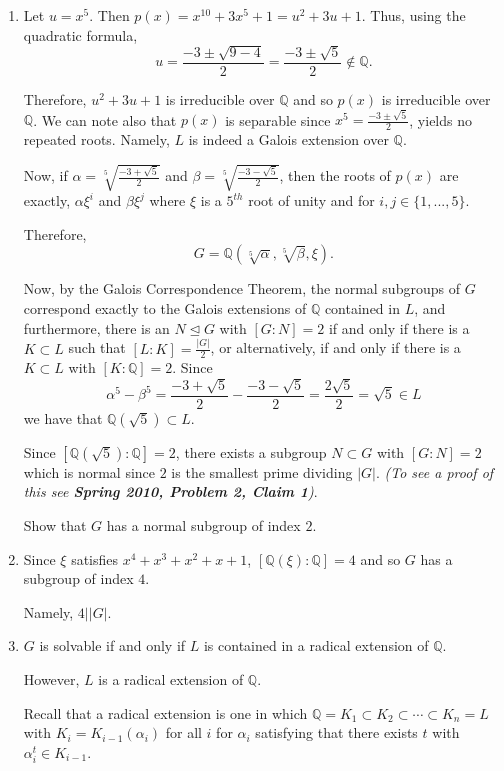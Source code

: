 \documentclass[12pt]{AlgebraQual}
\begin{document}
\begin{solution}$\,$
\begin{enumerate}[label=(\alph*)]
    \item Let $u=x^5$. Then $p(x)=x^{10}+3x^5+1=u^2+3u+1.$ Thus, using the quadratic formula, $$u=\frac{-3\pm\sqrt{9-4}}{2}=\frac{-3\pm\sqrt{5}}{2}\notin\mathbb{Q}.$$

    Therefore, $u^2+3u+1$ is irreducible over $\mathbb{Q}$ and so $p(x)$ is irreducible over $\mathbb{Q}$. We can note also that $p(x)$ is separable since $x^5=\frac{-3\pm\sqrt{5}}{2}$, yields no repeated roots. Namely, $L$ is indeed a Galois extension over $\mathbb{Q}$.

    Now, if $\alpha=\sqrt[5]{\frac{-3+\sqrt{5}}{2}}$ and $\beta=\sqrt[5]{\frac{-3-\sqrt{5}}{2}}$, then the roots of $p(x)$ are exactly, $\alpha\xi^i$ and $\beta\xi^j$ where $\xi$ is a $5^{th}$ root of unity and for $i,j\in\{1,...,5\}$.

    Therefore, $$G=\mathbb{Q}(\sqrt[5]{\alpha},\sqrt[5]{\beta},\xi).$$

    Now, by the Galois Correspondence Theorem, the normal subgroups of $G$ correspond exactly to the Galois extensions of $\mathbb{Q}$ contained in $L$, and furthermore, there is an $N\trianglelefteq G$ with $[G:N]=2$ if and only if there is a $K\subset L$ such that $[L:K]=\frac{|G|}{2}$, or alternatively, if and only if there is a $K\subset L$ with $[K:\mathbb{Q}]=2.$ Since $$\alpha^5-\beta^5=\frac{-3+\sqrt{5}}{2}-\frac{-3-\sqrt{5}}{2}=\frac{2\sqrt{5}}{2}=\sqrt{5}\in L$$ we have that $\mathbb{Q}(\sqrt{5})\subset L$.

    Since $[\mathbb{Q}(\sqrt{5}):\mathbb{Q}]=2$, there exists a subgroup $N\subset G$ with $[G:N]=2$ which is normal since $2$ is the smallest prime dividing $|G|.$ \textit{(To see a proof of this see \textbf{Spring 2010, Problem 2, Claim 1})}.

    Show that $G$ has a normal subgroup of index $2$.
    \item Since $\xi$ satisfies $x^4+x^3+x^2+x+1$, $[\mathbb{Q}(\xi):\mathbb{Q}]=4$ and so $G$ has a subgroup of index $4.$

    Namely, $4||G|.$

    \item $G$ is solvable if and only if $L$ is contained in a radical extension of $\mathbb{Q}$.

    However, $L$ is a radical extension of $\mathbb{Q}$.

    Recall that a radical extension is one in which $\mathbb{Q}=K_1\subset K_2\subset\cdots\subset K_n=L$ with $K_i=K_{i-1}(\alpha_i)$ for all $i$ for $\alpha_i$ satisfying that there exists $t$ with $\alpha_i^t\in K_{i-1}$.


\end{enumerate}
\end{solution}
\end{document}

